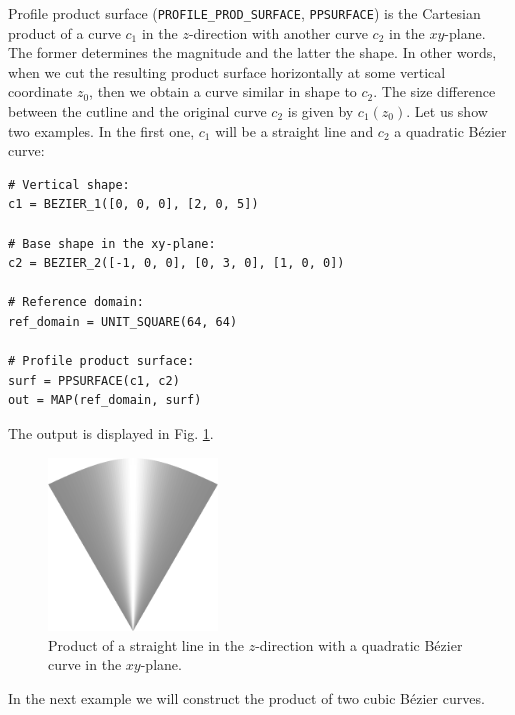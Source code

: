 Profile product surface ({\tt PROFILE\_PROD\_SURFACE}, {\tt PPSURFACE}) is the 
Cartesian product of a curve $c_1$ in the $z$-direction with another curve 
$c_2$ in the $xy$-plane. The former determines the magnitude and the latter the shape.
In other words, when we cut the resulting product surface horizontally at some 
vertical coordinate $z_0$, then we obtain a curve similar in shape to $c_2$. The 
size difference between the cutline and the original curve $c_2$ is given by 
$c_1(z_0)$. 
Let us show two examples. In the first one, $c_1$ will be a straight 
line and $c_2$ a quadratic B\'ezier curve:\\

\begin{bbox}
\begin{verbatim}
# Vertical shape:
c1 = BEZIER_1([0, 0, 0], [2, 0, 5])

# Base shape in the xy-plane:
c2 = BEZIER_2([-1, 0, 0], [0, 3, 0], [1, 0, 0])

# Reference domain:
ref_domain = UNIT_SQUARE(64, 64)

# Profile product surface: 
surf = PPSURFACE(c1, c2)
out = MAP(ref_domain, surf)
\end{verbatim}
\end{bbox}
\vspace{6mm}

\noindent
The output is displayed in Fig. \ref{fig:curves-13b}.\\

\begin{figure}[!ht]
\begin{center}
\includegraphics[width=0.4\textwidth]{img/curves-13b.png}
\end{center}
\vspace{-4mm}
\caption{Product of a straight line in the $z$-direction with a quadratic B\'ezier 
         curve in the $xy$-plane.}
\label{fig:curves-13b}
\end{figure}
\noindent
In the next example we will construct the product of two cubic 
B\'ezier curves.\\

